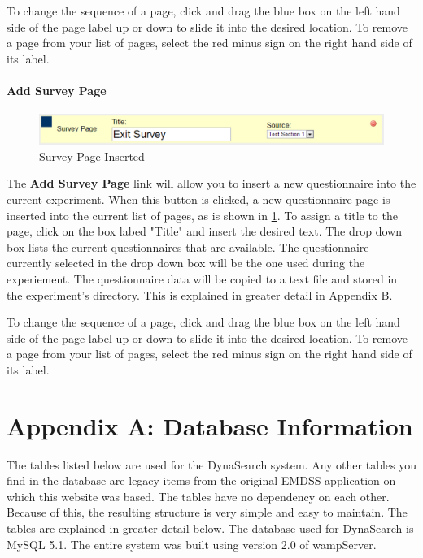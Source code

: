 \documentclass[article]{ij4uq}              %
\begin{document}
To change the sequence of a page, click and drag the blue box on the left hand side of the page label up or down to slide it into the desired location. To remove a page from your list of pages, select the red minus sign on the right hand side of its label.

\paragraph{Add Survey Page}

\begin{figure}[h!]
 \centering
 \includegraphics[width=5.0in]{figures/add_survey.png}
 \caption{Survey Page Inserted}
 \label{fig:surveyInsert}
\end{figure}
\FloatBarrier

The \textbf{Add Survey Page} link will allow you to insert a new questionnaire into the current experiment. When this button is clicked, a new questionnaire page is inserted into the current list of pages, as is shown in \ref{fig:surveyInsert}.   To assign a title to the page, click on the box labed "Title" and insert the desired text.  The drop down box lists the current questionnaires  that are available.  The questionnaire currently selected in the drop down box will be the one used during the experiement.  The questionnaire data will be copied to a text file and stored in the experiment's directory.  This is explained in greater detail in Appendix B.

To change the sequence of a page, click and drag the blue box on the left hand side of the page label up or down to slide it into the desired location. To remove a page from your list of pages, select the red minus sign on the right hand side of its label.

\section{Appendix A: Database Information}
The tables listed below are used for the DynaSearch system. Any other tables you find in the database are legacy items from the original EMDSS application on which this website was based. The tables have no dependency on each other. Because of this, the resulting structure is very simple and easy to maintain. The tables are explained in greater detail below. The database used for DynaSearch is MySQL 5.1. The entire system was built using version 2.0 of wampServer.
\end{document}
